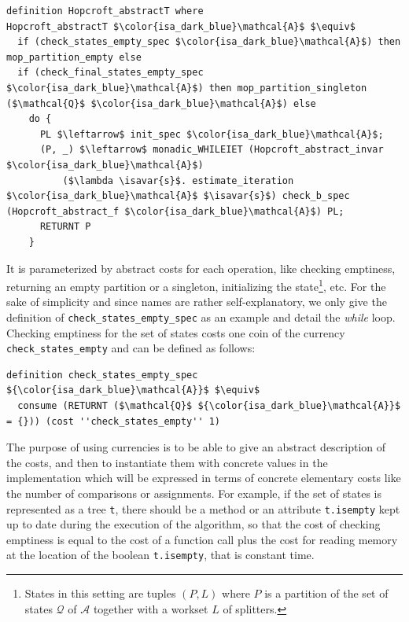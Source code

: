 \documentclass[12pt, a4 paper]{article}
\newcommand{\isavar}[1]{{\color{isa_dark_green}\text{#1}}}
\theoremstyle{definition}
\begin{document}
\noindent
\begin{minipage}{\linewidth}
\begin{lstlisting}[language=Isabelle]
definition Hopcroft_abstractT where
Hopcroft_abstractT $\color{isa_dark_blue}\mathcal{A}$ $\equiv$
  if (check_states_empty_spec $\color{isa_dark_blue}\mathcal{A}$) then mop_partition_empty else 
  if (check_final_states_empty_spec $\color{isa_dark_blue}\mathcal{A}$) then mop_partition_singleton ($\mathcal{Q}$ $\color{isa_dark_blue}\mathcal{A}$) else
    do {
      PL $\leftarrow$ init_spec $\color{isa_dark_blue}\mathcal{A}$;
      (P, _) $\leftarrow$ monadic_WHILEIET (Hopcroft_abstract_invar $\color{isa_dark_blue}\mathcal{A}$) 
          ($\lambda \isavar{s}$. estimate_iteration $\color{isa_dark_blue}\mathcal{A}$ $\isavar{s}$) check_b_spec (Hopcroft_abstract_f $\color{isa_dark_blue}\mathcal{A}$) PL;
      RETURNT P
    }
\end{lstlisting}
\end{minipage}

It is parameterized by abstract costs for each operation, like checking emptiness, returning an empty partition or a singleton, initializing the state\footnote{States in this setting are tuples $(P, L)$ where $P$ is a partition of the set of states $\mathcal{Q}$ of $\mathcal{A}$ together with a workset $L$ of splitters.}, etc.
For the sake of simplicity and since names are rather self-explanatory, we only give the definition of \texttt{check\_states\_empty\_spec} as an example and detail the \textit{while} loop. Checking emptiness for the set of states costs one coin of the currency \texttt{check\_states\_empty} and can be defined as follows:

\begin{lstlisting}[language=Isabelle]
definition check_states_empty_spec ${\color{isa_dark_blue}\mathcal{A}}$ $\equiv$
  consume (RETURNT ($\mathcal{Q}$ ${\color{isa_dark_blue}\mathcal{A}}$ = {})) (cost ''check_states_empty'' 1)
\end{lstlisting}

The purpose of using currencies is to be able to give an abstract description of the costs, and then to instantiate them with concrete values in the implementation which will be expressed in terms of concrete elementary costs like the number of comparisons or assignments. For example, if the set of states is represented as a tree \texttt{t}, there should be a method or an attribute \texttt{t.isempty} kept up to date during the execution of the algorithm, so that the cost of checking emptiness is equal to the cost of a function call plus the cost for reading memory at the location of the boolean \texttt{t.isempty}, that is constant time.
\end{document}
